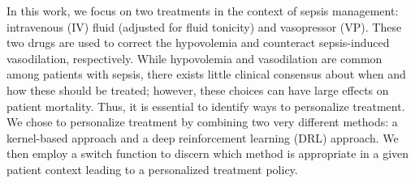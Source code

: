 \documentclass[10pt]{amia}
\begin{document}
In this work, we focus on two treatments in the context of sepsis management: intravenous (IV) fluid (adjusted for fluid tonicity) and vasopressor (VP). These two drugs are used to correct the hypovolemia and counteract sepsis-induced vasodilation, respectively.  While hypovolemia and vasodilation are common among patients with sepsis, there exists little clinical consensus about when and how these should be treated;\cite{marik2015demise} however, these choices can have large effects on patient mortality.\cite{waechter2014interaction}  Thus, it is essential to identify ways to personalize treatment.  We chose to personalize treatment by combining two very different methods: a kernel-based approach and a deep reinforcement learning (DRL) approach. We then employ a switch function to discern which method is appropriate in a given patient context leading to a personalized treatment policy. 


\end{document}

